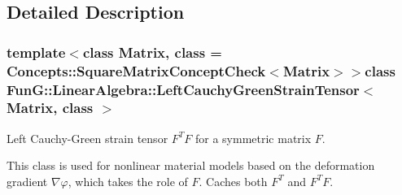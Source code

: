 \subsection{\-Detailed \-Description}
\subsubsection*{template$<$class Matrix, class = \-Concepts\-::\-Square\-Matrix\-Concept\-Check$<$\-Matrix$>$$>$class Fun\-G\-::\-Linear\-Algebra\-::\-Left\-Cauchy\-Green\-Strain\-Tensor$<$ Matrix, class $>$}

\-Left \-Cauchy-\/\-Green strain tensor $ F^T F $ for a symmetric matrix $ F $. 

\-This class is used for nonlinear material models based on the deformation gradient $\nabla\varphi$, which takes the role of $F$. \-Caches both $ F^T $ and $ F^T F $. 

